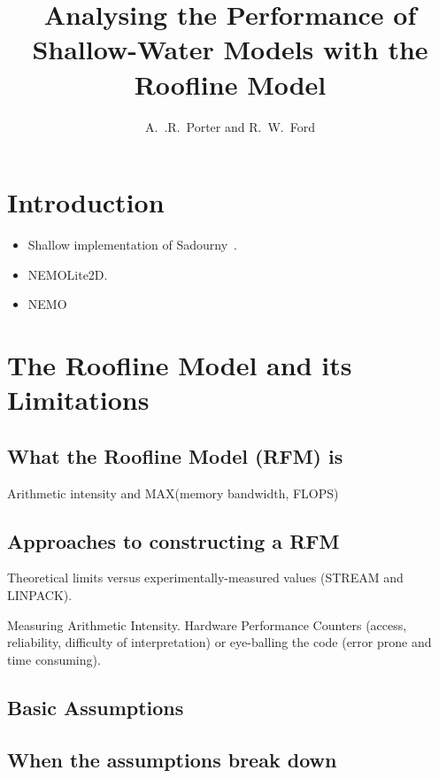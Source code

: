 \documentclass[12pt]{article}
\begin{document}
\title{Analysing the Performance of Shallow-Water Models with the
 Roofline Model}

\author{A.~.R.~Porter and R.~W.~Ford}

\maketitle

\tableofcontents

\section{Introduction}

\begin{itemize}
\item Shallow implementation of Sadourny~\cite{sadourny75}.
\item NEMOLite2D.
\item NEMO
\end{itemize}

\section{The Roofline Model and its Limitations}

\subsection{What the Roofline Model (RFM) is}

Arithmetic intensity and MAX(memory bandwidth, FLOPS)

\subsection{Approaches to constructing a RFM}

Theoretical limits versus experimentally-measured values (STREAM and
LINPACK).

Measuring Arithmetic Intensity. Hardware Performance Counters (access,
reliability, difficulty of interpretation) or eye-balling the code
(error prone and time consuming).

\subsection{Basic Assumptions}
\subsection{When the assumptions break down}
\end{document}
